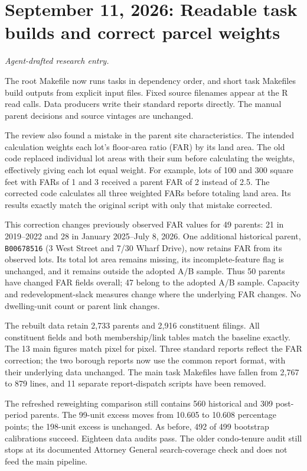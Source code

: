 \clearpage
\section*{September 11, 2026: Readable task builds and correct parcel weights}
\textit{Agent-drafted research entry.}

The root Makefile now runs tasks in dependency order, and short task Makefiles
build outputs from explicit input files. Fixed source filenames appear at the
R read calls. Data producers write their standard reports directly. The manual
parent decisions and source vintages are unchanged.

The review also found a mistake in the parent site characteristics. The intended
calculation weights each lot's floor-area ratio (FAR) by its land area. The old
code replaced individual lot areas with their sum before calculating the
weights, effectively giving each lot equal weight. For example, lots of 100 and
300 square feet with FARs of 1 and 3 received a parent FAR of 2 instead of 2.5.
The corrected code calculates all three weighted FARs before totaling land area.
Its results exactly match the original script with only that mistake corrected.

This correction changes previously observed FAR values for 49 parents:
21 in 2019--2022 and 28 in January 2025--July 8, 2026. One additional historical
parent, \texttt{B00678516} (3 West Street and 7/30 Wharf Drive), now retains FAR
from its observed lots. Its total lot area remains missing, its incomplete-feature
flag is unchanged, and it remains outside the adopted A/B sample. Thus 50
parents have changed FAR fields overall; 47 belong to the adopted A/B sample.
Capacity and redevelopment-slack measures change where the underlying FAR
changes. No dwelling-unit count or parent link changes.

The rebuilt data retain 2,733 parents and 2,916 constituent filings. All
constituent fields and both membership/link tables match the baseline exactly.
The 13 main figures match pixel for pixel. Three standard reports reflect
the FAR correction; the two borough reports now use the common report format,
with their underlying data unchanged. The main task Makefiles have fallen from
2,767 to 879 lines, and 11 separate report-dispatch scripts have been removed.

The refreshed reweighting comparison still contains 560 historical and 309
post-period parents. The 99-unit excess moves from 10.605 to 10.608 percentage
points; the 198-unit excess is unchanged. As before, 492 of 499 bootstrap
calibrations succeed. Eighteen data audits pass. The older condo-tenure audit
still stops at its documented Attorney General search-coverage check and does
not feed the main pipeline.

